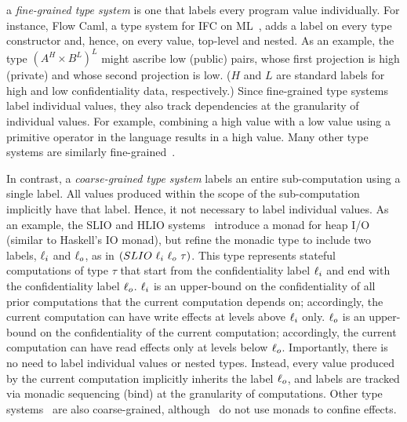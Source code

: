  a \emph{fine-grained type
  system} is one that labels every program value individually. For
instance, Flow Caml, a type system for IFC on
ML~\cite{toplas03-flowcaml}, adds a label on every type constructor
and, hence, on every value, top-level and nested. As an example, the
type $(A^H \times B^L)^L$ might ascribe low (public) pairs, whose
first projection is high (private) and whose second projection is
low. ($H$ and $L$ are standard labels for high and low confidentiality
data, respectively.) Since fine-grained type systems label individual
values, they also track dependencies at the granularity of individual
values. For example, combining a high value with a low value using a
primitive operator in the language results in a high value. Many other
type systems are similarly
fine-grained~\cite{jcs96-volpanoSmith,tosem00-jif,aplas13-paragon,popl98-SLAM}.

In contrast, a \emph{coarse-grained type system} labels an entire
sub-computation using a single label. All values produced within the
scope of the sub-computation implicitly have that label. Hence, it not
necessary to label individual values.
%
As an example, the SLIO and HLIO systems~\cite{icfp15-HLIO} introduce
a monad for heap I/O (similar to Haskell's IO monad), but refine the
monadic type to include two labels, $\ell_i$ and $\ell_o$, as in
$(SLIO~\ell_i~\ell_o~\tau)$. This type represents stateful
computations of type $\tau$ that start from the confidentiality label
$\ell_i$ and end with the confidentiality label
$\ell_o$. $\ell_i$ is an upper-bound on the confidentiality of
all prior computations that the current computation depends on;
accordingly, the current computation can have write effects at levels
above $\ell_i$ only. $\ell_o$ is an upper-bound on the
confidentiality of the current computation; accordingly, the current
computation can have read effects only at levels below
$\ell_o$. Importantly, there is no need to label individual values
or nested types. Instead, every value produced by the current
computation implicitly inherits the label $\ell_o$, and labels are
tracked via monadic sequencing (bind) at the granularity of
computations. Other type
systems~\cite{DBLP:journals/jcs/MatosB09,DBLP:conf/Boudol08,popl99-DCC}
are also coarse-grained,
although~\cite{DBLP:journals/jcs/MatosB09,DBLP:conf/Boudol08} do not
use monads to confine effects.

